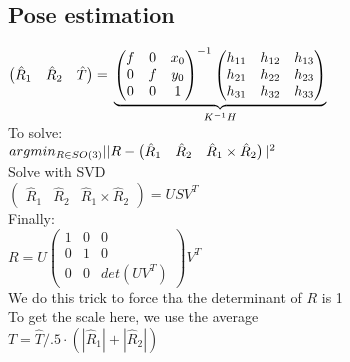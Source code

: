 \subsection*{Pose estimation}
$\begin{pmatrix} \hat{R}_1 & \hat{R}_2 & \hat{T}\end{pmatrix}
=\\
\underbrace{
\begin{pmatrix}
  f & 0 & x_0 \\ 0 & f &y_0\\0 & 0 & 1
\end{pmatrix}^{-1}
\begin{pmatrix}
  h_{11} & h_{12} & h_{13} \\
  h_{21} & h_{22} & h_{23} \\
  h_{31} & h_{32} & h_{33}
\end{pmatrix}
}_{K^{-1} H}
$\\
To solve:\\
$argmin_{R\in SO(3)}\\
||R -
\begin{pmatrix}
  \hat{R}_1 & \hat{R}_2 & \hat{R}_1 \times \hat{R}_2
\end{pmatrix}|^2$\\
Solve with SVD\\
$\begin{pmatrix}
  \hat{R}_1 & \hat{R}_2 & \hat{R}_1 \times \hat{R}_2
\end{pmatrix} = U S V^T$\\
Finally:\\
$R = U
\begin{pmatrix}
  1 & 0 & 0\\
  0 & 1 & 0\\
  0 & 0 & det(U V^T)
\end{pmatrix} V^T$ \\
\alert{We do this trick to force tha the determinant of $R$ is 1}\\
\alert{To get the scale here, we use the average}\\
$T = \hat{T}/.5\cdot(|\hat{R}_1|+|\hat{R}_2|)$
